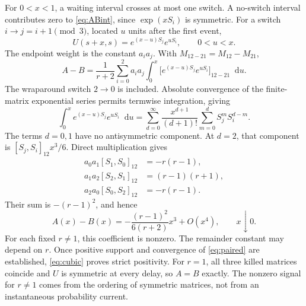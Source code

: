 \documentclass[11pt,a4paper]{article}
\newcommand{\dd}{\mathop{}\!\mathrm{d}}
\begin{document}
For $0<x<1$, a waiting interval crosses at most one switch. A no-switch interval contributes zero to \eqref{eq:ABint}, since $\exp(xS_i)$ is symmetric. For a switch $i\to j=i+1\pmod3$, located $u$ units after the first event,
\begin{equation}
 U(s+x,s)=e^{(x-u)S_j}e^{uS_i},\qquad 0<u<x.
 \label{eq:switchU}
\end{equation}
The endpoint weight is the constant $a_i a_j$. With $M_{12-21}=M_{12}-M_{21}$,
\begin{equation}
 A-B=\frac1{r+2}\sum_{i=0}^2a_i a_j\int_0^x
 \bigl[e^{(x-u)S_j}e^{uS_i}\bigr]_{12-21}\dd u.
 \label{eq:crossing}
\end{equation}
The wraparound switch $2\to0$ is included. Absolute convergence of the finite-matrix exponential series permits termwise integration, giving
\begin{equation}
 \int_0^xe^{(x-u)S_j}e^{uS_i}\dd u
 =\sum_{d=0}^{\infty}\frac{x^{d+1}}{(d+1)!}
 \sum_{m=0}^{d}S_j^mS_i^{d-m}.
 \label{eq:series}
\end{equation}
The terms $d=0,1$ have no antisymmetric component. At $d=2$, that component is $[S_j,S_i]_{12}x^3/6$. Direct multiplication gives
\begin{equation}
 \begin{split}
 a_0a_1[S_1,S_0]_{12}&=-r(r-1),\\
 a_1a_2[S_2,S_1]_{12}&=(r-1)(r+1),\\
 a_2a_0[S_0,S_2]_{12}&=-r(r-1).
 \end{split}
 \label{eq:commutators}
\end{equation}
Their sum is $-(r-1)^2$, and hence
\begin{equation}
 \boxed{\displaystyle
 A(x)-B(x)=-\frac{(r-1)^2}{6(r+2)}x^3+O(x^4),\qquad x\downarrow0.}
 \label{eq:cubic}
\end{equation}
For each fixed $r\ne1$, this coefficient is nonzero. The remainder constant may depend on $r$. Once positive support and convergence of \eqref{eq:paired} are established, \eqref{eq:cubic} proves strict positivity. For $r=1$, all three killed matrices coincide and $U$ is symmetric at every delay, so $A=B$ exactly. The nonzero signal for $r\ne1$ comes from the ordering of symmetric matrices, not from an instantaneous probability current.
\end{document}
